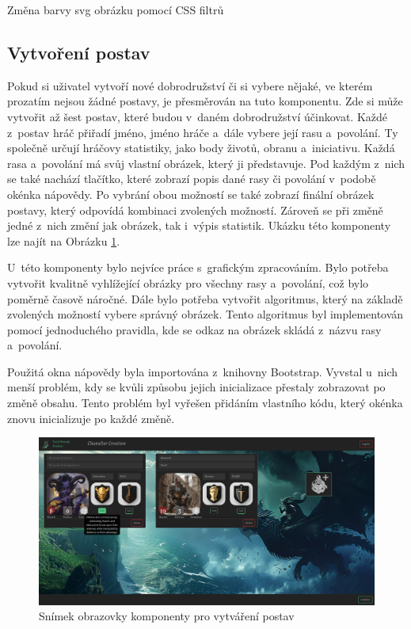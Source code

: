 \begin{listing}[H]
  \inputminted[breaklines]{css}{resources/code/svg_color.css}
  \caption{Změna barvy svg obrázku pomocí CSS filtrů}
  \label{code:svg_filter}
\end{listing}

\subsection{Vytvoření postav}
Pokud si uživatel vytvoří nové dobrodružství či si vybere nějaké, ve kterém prozatím nejsou žádné postavy, je přesměrován na tuto komponentu. Zde si může vytvořit až šest postav, které budou v~daném dobrodružství účinkovat. Každé z~postav hráč přiřadí jméno, jméno hráče a~dále vybere její rasu a~povolání. Ty společně určují hráčovy statistiky, jako body životů, obranu a~iniciativu. Každá rasa a~povolání má svůj vlastní obrázek, který ji představuje. Pod každým z~nich se také nachází tlačítko, které zobrazí popis dané rasy či povolání v~podobě okénka nápovědy. Po vybrání obou možností se také zobrazí finální obrázek postavy, který odpovídá kombinaci zvolených možností. Zároveň se při změně jedné z~nich změní jak obrázek, tak i~výpis statistik. Ukázku této komponenty lze najít na Obrázku \ref{fig:character-creation}.

U~této komponenty bylo nejvíce práce s~grafickým zpracováním. Bylo potřeba vytvořit kvalitně vyhlížející obrázky pro všechny rasy a~povolání, což bylo poměrně časově náročné. Dále bylo potřeba vytvořit algoritmus, který na základě zvolených možností vybere správný obrázek. Tento algoritmus byl implementován pomocí jednoduchého pravidla, kde se odkaz na obrázek skládá z~názvu rasy a~povolání.

Použitá okna nápovědy byla importována z~knihovny Bootstrap. Vyvstal u~nich menší problém, kdy se kvůli způsobu jejich inicializace přestaly zobrazovat po změně obsahu. Tento problém byl vyřešen přidáním vlastního kódu, který okénka znovu inicializuje po každé změně.

\begin{figure}[H]
  \centering
  \includegraphics[width=\textwidth]{resources/figures/TTS-Charracter Creation.png}
  \caption{Snímek obrazovky komponenty pro vytváření postav}
  \label{fig:character-creation}
\end{figure}

